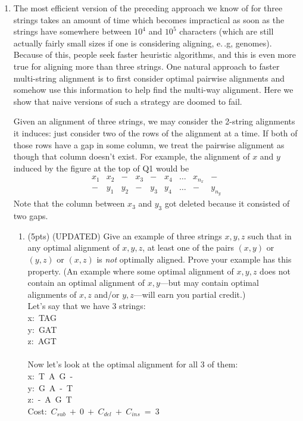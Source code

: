 \documentclass[12pt]{article}
\newcommand\tab[1][1cm]{\hspace*{#1}}
\begin{document}
\begin{enumerate}
\item The most efficient version of the preceding approach we know of for three strings takes an amount of time which becomes impractical as soon as the strings have somewhere between $10^4$ and $10^5$ characters (which are still actually fairly small sizes if one is considering aligning, e.\,.g, genomes). Because of this, people seek faster heuristic algorithms, and this is even more true for aligning more than three strings. One natural approach to faster multi-string alignment is to first consider optimal pairwise alignments and somehow use this information to help find the multi-way alignment. Here we show that naive versions of such a strategy are doomed to fail. 

Given an alignment of three strings, we may consider the 2-string alignments it induces: just consider two of the rows of the alignment at a time. If both of those rows have a gap in some column, we treat the pairwise alignment as though that column doesn't exist. For example, the alignment of $x$ and $y$ induced by the figure at the top of Q1 would be
\[
\begin{array}{ccccccccc}
x_1 & x_2 & - & x_3 &  - & x_4 & \dotsc & x_{n_x} & - \\
- & y_1 & y_2 & - &  y_3 & y_4 & \dotsc & - & y_{n_y} 
\end{array}
\]
Note that the column between $x_3$ and $y_3$ got deleted because it consisted of two gaps.
\pagebreak

\begin{enumerate}
\item \label{2a} (5pts) (UPDATED) Give an example of three strings $x,y,z$ such that in any optimal alignment of $x,y,z$, at least one of the pairs $(x,y)$ or $(y,z)$ or $(x,z)$ is \emph{not} optimally aligned. 
Prove your example has this property. (An example where some %
optimal alignment of $x,y,z$ does not contain an optimal alignment of $x,y$---but may contain optimal alignments of $x,z$ and/or $y,z$---will earn you partial credit.)
\\
Let's say that we have 3 strings:\\
\tab x:~TAG\\
\tab y:~GAT\\
\tab z:~AGT\\
\\
Now let's look at the optimal alignment for all 3 of them:\\
\tab x:~T~A~G~-\\
\tab y:~G~A~-~T\\
\tab z:~-~A~G~T\\
\tab Cost:~$C_{sub}~+~0~+~C_{del}~+~C_{ins}~=~3$\\


\end{enumerate}
\end{enumerate}
\end{document}
